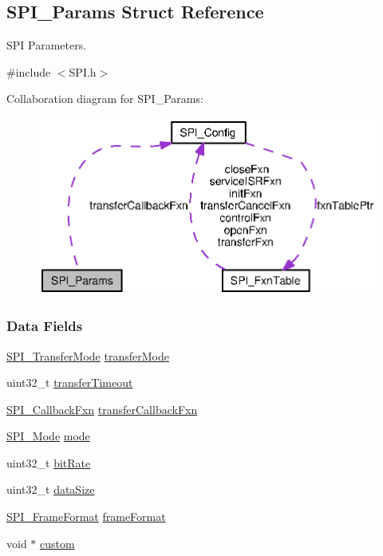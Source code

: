 \subsection{S\+P\+I\+\_\+\+Params Struct Reference}
\label{struct_s_p_i___params}


S\+P\+I Parameters.  




{\ttfamily \#include $<$S\+P\+I.\+h$>$}



Collaboration diagram for S\+P\+I\+\_\+\+Params\+:
\nopagebreak
\begin{figure}[H]
\begin{center}
\leavevmode
\includegraphics[width=344pt]{struct_s_p_i___params__coll__graph}
\end{center}
\end{figure}
\subsubsection*{Data Fields}
\begin{DoxyCompactItemize}
\item 
\hyperlink{_s_p_i_8h_ab9ea76c6529d6076eee5e1c4a5a92c6f}{S\+P\+I\+\_\+\+Transfer\+Mode} \hyperlink{struct_s_p_i___params_a16dbcc3768a01fb7deae25b48fc0d69c}{transfer\+Mode}
\item 
uint32\+\_\+t \hyperlink{struct_s_p_i___params_a600801907cf396a96825eaf69781913a}{transfer\+Timeout}
\item 
\hyperlink{_s_p_i_8h_a207e2d5a7e7ea5606b6995b6485ca015}{S\+P\+I\+\_\+\+Callback\+Fxn} \hyperlink{struct_s_p_i___params_a68d1d610da6a6bf299121b939ef2a352}{transfer\+Callback\+Fxn}
\item 
\hyperlink{_s_p_i_8h_a60a7e3d74577b38aa79ea6983362f942}{S\+P\+I\+\_\+\+Mode} \hyperlink{struct_s_p_i___params_abe5eca64adf4ca96bed206a271d9b157}{mode}
\item 
uint32\+\_\+t \hyperlink{struct_s_p_i___params_ab3f035044fdbe75adac8c1d729d8cf20}{bit\+Rate}
\item 
uint32\+\_\+t \hyperlink{struct_s_p_i___params_a30722b1de5e3b089ecf0c669da42ed2d}{data\+Size}
\item 
\hyperlink{_s_p_i_8h_a4e1f33555dfa8147205af5b266f3a489}{S\+P\+I\+\_\+\+Frame\+Format} \hyperlink{struct_s_p_i___params_a67b5ebb8ec72796a0260c427c91cc093}{frame\+Format}
\item 
void $\ast$ \hyperlink{struct_s_p_i___params_a909f58a310514d16b4fee1b51033d976}{custom}
\end{DoxyCompactItemize}


